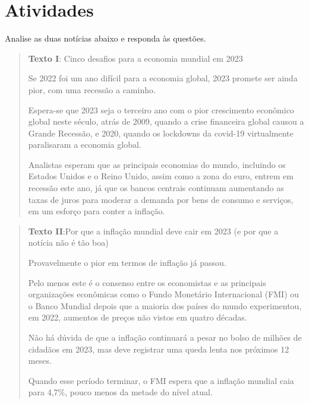 \section{Atividades}

Analise as duas notícias abaixo e responda às questões.

\begin{quote}

\textbf{Texto I}: Cinco desafios para a economia mundial em 2023

Se 2022 foi um ano difícil para a economia global, 2023 promete ser
ainda pior, com uma recessão a caminho.

Espera-se que 2023 seja o terceiro ano com o pior crescimento econômico
global neste século, atrás de 2009, quando a crise financeira global
causou a Grande Recessão, e 2020, quando os lockdowns da covid-19
virtualmente paralisaram a economia global.

Analistas esperam que as principais economias do mundo, incluindo os
Estados Unidos e o Reino Unido, assim como a zona do euro, entrem em
recessão este ano, já que os bancos centrais continuam aumentando as
taxas de juros para moderar a demanda por bens de consumo e serviços, em
um esforço para conter a inflação. 


\end{quote}

\begin{quote}

\textbf{Texto II}:Por que a inflação mundial deve cair em 2023 (e por que a
notícia não é tão boa)

Provavelmente o pior em termos de inflação já passou.

Pelo menos este é o consenso entre os economistas e as principais
organizações econômicas como o Fundo Monetário Internacional (FMI) ou o
Banco Mundial depois que a maioria dos países do mundo experimentou, em
2022, aumentos de preços não vistos em quatro décadas.

Não há dúvida de que a inflação continuará a pesar no bolso de milhões
de cidadãos em 2023, mas deve registrar uma queda lenta nos próximos 12
meses.

Quando esse período terminar, o FMI espera que a inflação mundial caia
para 4,7\%, pouco menos da metade do nível atual. 

\end{quote}

